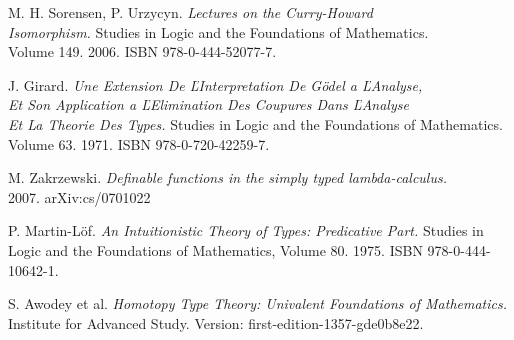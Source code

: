 \documentclass{article}[12pt]
\begin{document}
\begin{thebibliography}{}
    M. H. Sorensen, P. Urzycyn. \textit{Lectures on the Curry-Howard \\ Isomorphism.}
    Studies in Logic and the Foundations of Mathematics. \\ Volume 149. 2006. ISBN
    978-0-444-52077-7.

    J. Girard. \textit{Une Extension De ĽInterpretation De Gödel a ĽAnalyse, \\ Et Son Application  a ĽElimination Des Coupures Dans ĽAnalyse  \\ Et La Theorie Des Types.}
    Studies in Logic and the Foundations of Mathematics. Volume 63. 1971. ISBN 978-0-720-42259-7.

    M. Zakrzewski. \textit{Definable functions in the simply typed lambda-calculus.} \\ 2007.
    arXiv:cs/0701022
    
    P. Martin-Löf. \textit{An Intuitionistic Theory of Types: Predicative Part.} Studies in Logic and the Foundations of Mathematics,
    Volume 80. 1975. ISBN 978-0-444-10642-1.

    S. Awodey et al. \textit{Homotopy Type Theory: Univalent Foundations of Mathematics.} Institute for Advanced Study.
    Version: first-edition-1357-gde0b8e22.
\end{thebibliography}
\end{document}

